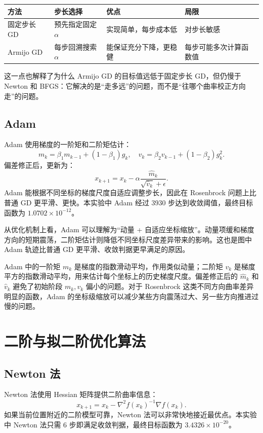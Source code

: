 \documentclass[UTF8,a4paper,12pt,fontset=none]{ctexart}
\begin{document}
\begin{table}[H]
\centering
\small
\begin{tabular}{llll}
\toprule
方法 & 步长选择 & 优点 & 局限 \\
\midrule
固定步长 GD & 预先指定固定 $\alpha$ & 实现简单，每步成本低 & 对步长敏感 \\
Armijo GD & 每步回溯搜索 $\alpha$ & 能保证充分下降，更稳健 & 每步可能多次计算函数值 \\
\bottomrule
\end{tabular}
\end{table}

这一点也解释了为什么 Armijo GD 的目标值远低于固定步长 GD，但仍慢于 Newton 和 BFGS：它解决的是“走多远”的问题，而不是“往哪个曲率校正方向走”的问题。

\subsection{Adam}

Adam 使用梯度的一阶矩和二阶矩估计：
\[
m_k=\beta_1m_{k-1}+(1-\beta_1)g_k,\quad
v_k=\beta_2v_{k-1}+(1-\beta_2)g_k^2.
\]
偏差修正后，更新为：
\[
x_{k+1}=x_k-\alpha\frac{\hat m_k}{\sqrt{\hat v_k}+\epsilon}.
\]
Adam 能根据不同坐标的梯度尺度自适应调整步长，因此在 Rosenbrock 问题上比普通 GD 更平滑、更快。本实验中 Adam 经过 3930 步达到收敛阈值，最终目标函数为 $1.0702\times10^{-12}$。

从优化机制上看，Adam 可以理解为“动量 + 自适应坐标缩放”。动量项缓和梯度方向的短期震荡，二阶矩估计则降低不同坐标尺度差异带来的影响。这也是图中 Adam 轨迹比普通 GD 更平滑、收敛判据更早满足的原因。

Adam 中的一阶矩 $m_k$ 是梯度的指数滑动平均，作用类似动量；二阶矩 $v_k$ 是梯度平方的指数滑动平均，用来估计每个坐标上的历史梯度尺度。偏差修正后的 $\hat m_k$ 和 $\hat v_k$ 避免了初始阶段 $m_k,v_k$ 偏小的问题。对于 Rosenbrock 这类不同方向曲率差异明显的函数，Adam 的坐标级缩放可以减少某些方向震荡过大、另一些方向推进过慢的问题。

\section{二阶与拟二阶优化算法}

\subsection{Newton 法}

Newton 法使用 Hessian 矩阵提供二阶曲率信息：
\[
x_{k+1}=x_k-\nabla^2 f(x_k)^{-1}\nabla f(x_k).
\]
如果当前位置附近的二阶模型可靠，Newton 法可以非常快地接近最优点。本实验中 Newton 法只需 6 步即满足收敛判据，最终目标函数为 $3.4326\times10^{-20}$。
\end{document}

